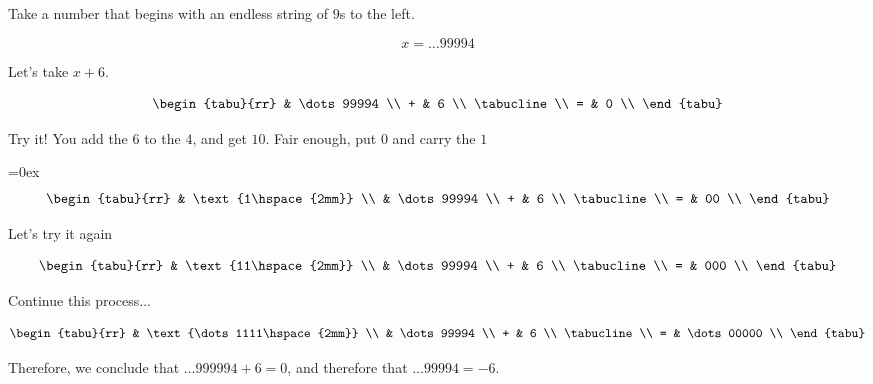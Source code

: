 \begin{example}
  Take a number that begins with an endless string of $9$s to the
  left.

  \begin{displaymath}
    x = \dots99994
  \end{displaymath}

  Let's take $x + 6$. 

  \begin{displaymath}
    \begin{tabu}{rr}
        & \dots99994 \\
      + & 6 \\
      \tabucline \\
      = & 0 \\
    \end{tabu}
  \end{displaymath}

  Try it! You add the $6$ to the $4$, and get $10$. Fair enough, put
  $0$ and carry the $1$

  \tabulinesep=0ex
  \begin{displaymath}
    \begin{tabu}{rr}
        & \text{1\hspace{2mm}}  \\
        & \dots99994 \\
      + & 6 \\
      \tabucline \\
      = & 00 \\
    \end{tabu}
  \end{displaymath}

  Let's try it again

  \begin{displaymath}
    \begin{tabu}{rr}
        & \text{11\hspace{2mm}}  \\
        & \dots99994 \\
      + & 6 \\
      \tabucline \\
      = & 000 \\
    \end{tabu}
  \end{displaymath}

  Continue this process...

  \begin{displaymath}
    \begin{tabu}{rr}
        & \text{\dots 1111\hspace{2mm}}  \\
        & \dots99994 \\
      + & 6 \\
      \tabucline \\
      = & \dots 00000 \\
    \end{tabu}
  \end{displaymath}

  Therefore, we conclude that $\dots999994 + 6 = 0$, and therefore
  that $\dots99994 = -6$.
\end{example}

